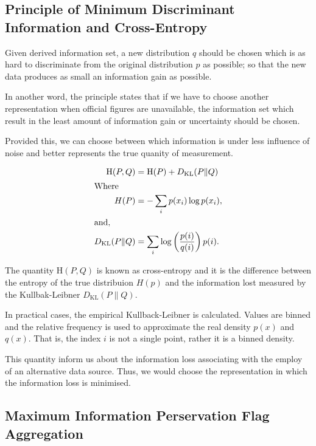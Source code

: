 \documentclass[nojss]{jss}
\begin{document}
\subsection{Principle of Minimum Discriminant Information and Cross-Entropy}

Given derived information set, a new distribution $q$ should be chosen
which is as hard to discriminate from the original distribution $p$ as
possible; so that the new data produces as small an information gain
as possible.

In another word, the principle states that if we have to choose
another representation when official figures are unavailable, the
information set which result in the least amount of information gain
or uncertainty should be chosen.

Provided this, we can choose between which information is under less
influence of noise and better represents the true quanity of
measurement.


\begin{align*}
  \mathrm{H}(P, Q) &=  \mathrm{H}(P) + D_{\mathrm{KL}}(P \| Q)\\
  \intertext{Where}
  H(P) &= -\sum_{i} {p(x_i) \log p(x_i)},\\
  \intertext{and,}
  D_{\mathrm{KL}}(P\|Q) &= \sum_i \log\left(\frac{p(i)}{q(i)}\right) p(i).\\
\end{align*}

The quantity $\mathrm{H}(P, Q)$ is known as cross-entropy and it is
the difference between the entropy of the true distribuion $H(p)$ and
the information lost measured by the Kullbak-Leibner
$D_{\mathrm{KL}}(P\|Q)$. 


In practical cases, the empirical Kullback-Leibner is
calculated. Values are binned and the relative frequency is used to
approximate the real density $p(x)$ and $q(x)$. That is, the index $i$
is not a single point, rather it is a binned density.

This quantity inform us about the information loss associating with
the employ of an alternative data source. Thus, we would choose the
representation in which the information loss is minimised.

\subsection{Maximum Information Perservation Flag Aggregation}
\end{document}
